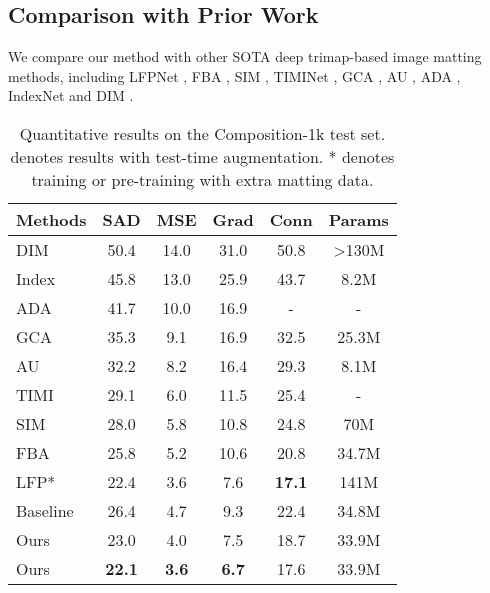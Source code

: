 \documentclass[10pt,twocolumn,letterpaper]{article}
\begin{document}
\subsection{Comparison with Prior Work}
We  compare our method with other SOTA deep trimap-based image matting methods, including LFPNet \cite{lfpnet}, FBA \cite{fba}, SIM \cite{sim}, TIMINet \cite{timinet}, GCA \cite{gca}, AU \cite{a2u}, ADA \cite{adamatting}, IndexNet \cite{indexnet} and DIM \cite{deepmatting}. 
\begin{table}[h]
    \begin{center}
     \caption{Quantitative results on the Composition-1k test set.  denotes results with test-time augmentation. * denotes training or pre-training with extra matting data.}
    \begin{tabular}{l|cccc|c}
        \hline
        Methods & SAD & MSE  & Grad & Conn & Params \\
        \hline
        
       
        DIM\cite{deepmatting}                & 50.4 & 14.0 & 31.0 & 50.8 &\textgreater 130M\\
        Index\cite{indexnet}           & 45.8 & 13.0 & 25.9 & 43.7&8.2M \\
        ADA \cite{adamatting}        &41.7& 10.0&16.9&-&-\\
        GCA \cite{gca}        & 35.3 & 9.1 & 16.9 & 32.5 &25.3M \\
        AU \cite{a2u}     & 32.2 & 8.2 & 16.4 & 29.3 &8.1M \\
        TIMI \cite{timinet}    & 29.1 & 6.0 & 11.5 & 25.4 & -\\
        SIM \cite{sim}        & 28.0 & 5.8 & 10.8 & 24.8 &  70M\\
        FBA \cite{fba}        & 25.8 & 5.2 & 10.6 & 20.8 & 34.7M\\
        LFP*\cite{lfpnet}  & 22.4 & 3.6 & 7.6 & \textbf{17.1} & 141M\\
        \hline
        Baseline & 26.4 & 4.7 & 9.3 & 22.4& 34.8M \\
        Ours & 23.0 & 4.0 & 7.5 & 18.7& 33.9M \\
        Ours  & \textbf{22.1} & \textbf{3.6} & \textbf{6.7} & 17.6 &33.9M\\
        \hline
    \end{tabular}
    \label{tab:comp1k}
    \end{center}
\end{table}
\end{document}
